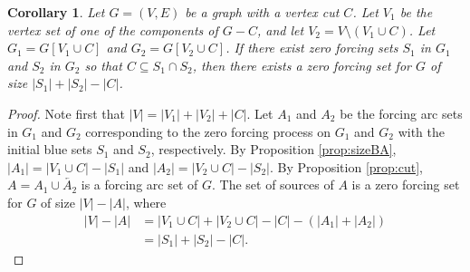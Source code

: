 \documentclass[12pt]{amsart}
\theoremstyle{plain}
\newtheorem{corollary}[theorem]{Corollary}
\theoremstyle{definition}
\begin{document}
    


\begin{corollary}
    Let $G=(V, E)$ be a graph with a vertex cut $C$. Let $V_1$ be the vertex set of one of the components of $G-C$, and let $V_2=V\setminus (V_1\cup C)$. Let $G_1=G[V_1\cup C]$ and $G_2=G[V_2\cup C]$. If there exist zero forcing sets $S_1$ in $G_1$ and $S_2$ in $G_2$ so that $C\subseteq S_1\cap S_2$, then there exists a zero forcing set for $G$ of size $|S_1|+|S_2|-|C|$.
\end{corollary}
\begin{proof}
Note first that $|V|=|V_1|+|V_2|+|C|$.
Let $A_1$ and $A_2$ be the forcing arc sets in $G_1$ and $G_2$ corresponding to the zero forcing process on $G_1$ and $G_2$ with the initial blue sets $S_1$ and $S_2$, respectively. By Proposition \ref{prop:sizeBA}, $|A_1|=|V_1\cup C|-|S_1|$ and  $|A_2|=|V_2\cup C|-|S_2|$. By Proposition \ref{prop:cut}, $A=A_1\cup \overleftarrow{A_2}$ is a forcing arc set of $G$. The set of sources of $A$ is a zero forcing set for $G$ of size $|V|-|A|$, where
\begin{equation*}\begin{split}
    |V|-|A| & = |V_1\cup C| + |V_2\cup C|- |C| - (|A_1|+|A_2|)\\
    & =|S_1|+|S_2|-|C|.
\end{split}\end{equation*}
\end{proof}
\end{document}
